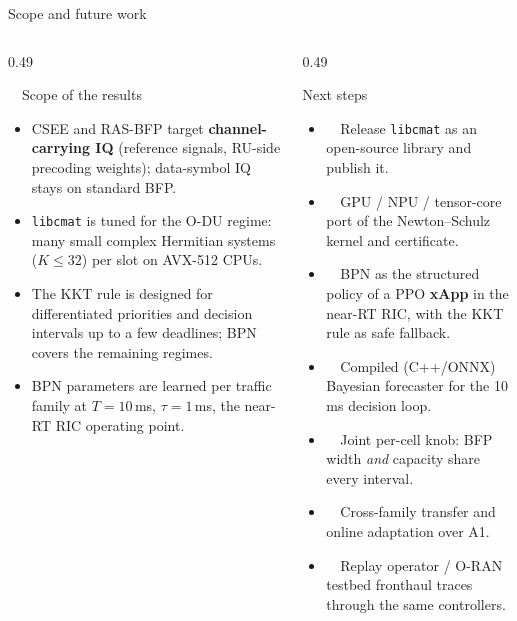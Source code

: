 \documentclass[aspectratio=169,10pt,xcolor={table,dvipsnames}]{beamer}
\begin{document}
\begin{frame}{Scope and future work}
\begin{columns}[T]
\begin{column}{0.49\textwidth}
\begin{block}{\ \ Scope of the results}
\footnotesize
\begin{itemize}
  \item CSEE and RAS-BFP target \textbf{channel-carrying IQ} (reference signals, RU-side precoding weights); data-symbol IQ stays on standard BFP.
  \item \texttt{libcmat} is tuned for the O-DU regime: many small complex Hermitian systems ($K \le 32$) per slot on AVX-512 CPUs.
  \item The KKT rule is designed for differentiated priorities and decision intervals up to a few deadlines; BPN covers the remaining regimes.
  \item BPN parameters are learned per traffic family at $T{=}10$\,ms, $\tau{=}1$\,ms, the near-RT RIC operating point.
\end{itemize}
\end{block}
\end{column}
\begin{column}{0.49\textwidth}
\begin{exampleblock}{Next steps}
\footnotesize
\begin{itemize}
  \item \faBook\ \ Release \texttt{libcmat} as an open-source library and publish it.
  \item \faMicrochip\ \ GPU / NPU / tensor-core port of the Newton--Schulz kernel and certificate.
  \item \faRobot\ \ BPN as the structured policy of a PPO \textbf{xApp} in the near-RT RIC, with the KKT rule as safe fallback.
  \item \faBolt\ \ Compiled (C++/ONNX) Bayesian forecaster for the 10\,ms decision loop.
  \item \faSlidersH\ \ Joint per-cell knob: BFP width \emph{and} capacity share every interval.
  \item {}\ \ Cross-family transfer and online adaptation over A1.
  \item \faDatabase\ \ Replay operator / O-RAN testbed fronthaul traces through the same controllers.
\end{itemize}
\end{exampleblock}
\end{column}
\end{columns}
\end{frame}
\end{document}

